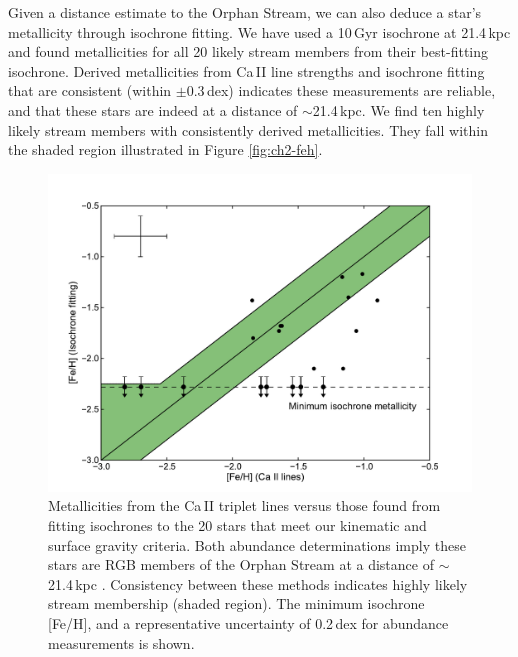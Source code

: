 Given a distance estimate to the Orphan Stream, we can also deduce a star's metallicity through isochrone fitting. We have used a 10\,Gyr \citet{Girardi_et-al_2008} isochrone at 21.4\,kpc \citep{Newberg_et-al_2010} and found metallicities for all 20 likely stream members from their best-fitting isochrone. Derived metallicities from Ca\,\textsc{II} line strengths and isochrone fitting that are consistent (within $\pm0.3$\,dex) indicates these measurements are reliable, and that these stars are indeed at a distance of $\sim$21.4\,kpc. We find ten highly likely stream members with consistently derived metallicities. They fall within the shaded region illustrated in Figure \ref{fig:ch2-feh}. 

\begin{figure}[t!]
	\includegraphics[width=\columnwidth]{./chapter2/fig3.pdf}
	\caption{Metallicities from the Ca\,\textsc{II} triplet lines versus those found from fitting isochrones to the 20 stars that meet our kinematic and surface gravity criteria. Both abundance determinations imply these stars are RGB members of the Orphan Stream at a distance of $\sim$21.4\,kpc \citep{Newberg_et-al_2010}. Consistency between these methods indicates highly likely stream membership (shaded region). The minimum isochrone [Fe/H], and a representative uncertainty of 0.2\,dex for abundance measurements is shown.}
	\label{fig:feh}
\end{figure}

